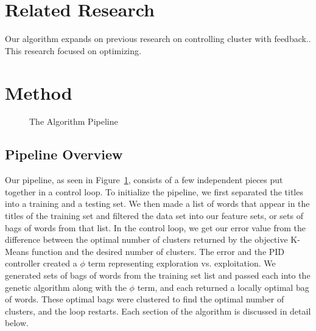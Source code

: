 \documentclass{sig-alternate}
\begin{document}
\section{Related Research}
Our algorithm expands on previous research on controlling cluster with feedback.\cite{ole:feedback}. This research focused on optimizing.

\section{Method}
\begin{figure}[t]
\centering
{}
\caption{The Algorithm Pipeline}
\label{fig:pipeline}
\end{figure}
\subsection{Pipeline Overview}
Our pipeline, as seen in Figure~\ref{fig:pipeline}, consists of a few independent pieces put together in a control loop. To initialize the pipeline, we first separated the titles into a training and a testing set. We then made a list of words that appear in the titles of the training set and filtered the data set into our feature sets, or sets of bags of words from that list. In the control loop, we get our error value from the difference between the optimal number of clusters returned by the objective K-Means function and the desired number of clusters. The error and the PID controller created a $\phi$ term representing exploration vs. exploitation. We generated sets of bags of words from the training set list and passed each into the genetic algorithm along with the $\phi$ term, and each returned a locally optimal bag of words. These optimal bags were clustered to find the optimal number of clusters, and the loop restarts. Each section of the algorithm is discussed in detail below.
\end{document}
